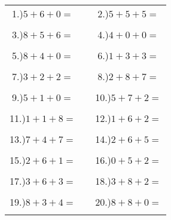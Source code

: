 \documentclass{article}
\begin{document}
\begin{tabular}{ccc}
1.)$5+6+0=$& \hspace{5cm} &2.)$5+5+5=$\\\\
3.)$8+5+6=$& \hspace{5cm} &4.)$4+0+0=$\\\\
5.)$8+4+0=$& \hspace{5cm} &6.)$1+3+3=$\\\\
7.)$3+2+2=$& \hspace{5cm} &8.)$2+8+7=$\\\\
9.)$5+1+0=$& \hspace{5cm} &10.)$5+7+2=$\\\\
11.)$1+1+8=$& \hspace{5cm} &12.)$1+6+2=$\\\\
13.)$7+4+7=$& \hspace{5cm} &14.)$2+6+5=$\\\\
15.)$2+6+1=$& \hspace{5cm} &16.)$0+5+2=$\\\\
17.)$3+6+3=$& \hspace{5cm} &18.)$3+8+2=$\\\\
19.)$8+3+4=$& \hspace{5cm} &20.)$8+8+0=$\\\\
\end{tabular}
\newpage
\end{document}
